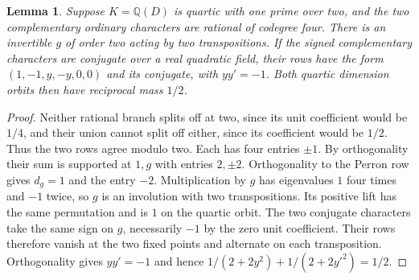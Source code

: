 \documentclass[11pt,reqno]{amsart}
\newtheorem{lemma}[theorem]{Lemma}
\theoremstyle{remark}\newtheorem{remark}[theorem]{Remark}
\numberwithin{equation}{section}
\begin{document}
\begin{lemma}\label{lem:quartic-four-rows}
Suppose $K=\mathbb Q(D)$ is quartic with one prime over two, and
the two complementary ordinary characters are rational of codegree four.
There is an invertible $g$ of order two acting by two transpositions.
If the signed complementary characters are conjugate over a real
quadratic field, their rows have the form
$(1,-1,y,-y,0,0)$ and its conjugate, with $yy'=-1$. Both quartic
dimension orbits then have reciprocal mass $1/2$.
\end{lemma}
\begin{proof}
Neither rational branch splits off at two, since its unit coefficient
would be $1/4$, and their union cannot split off either, since its
coefficient would be $1/2$. Thus the two rows agree modulo two.
Each has four entries $\pm1$. By orthogonality their sum is supported
at $1,g$ with entries $2,\pm2$. Orthogonality to the Perron row
gives $d_g=1$ and the entry $-2$. Multiplication by $g$ has eigenvalues
$1$ four times and $-1$ twice, so $g$ is an involution with two
transpositions. Its positive lift has the same permutation and is $1$
on the quartic orbit. The two conjugate characters take the same sign
on $g$, necessarily $-1$ by the zero unit coefficient. Their rows
therefore vanish at the two fixed points and alternate on each
transposition. Orthogonality gives $yy'=-1$ and hence
$1/(2+2y^2)+1/(2+2y'^2)=1/2$.
\end{proof}
\end{document}
